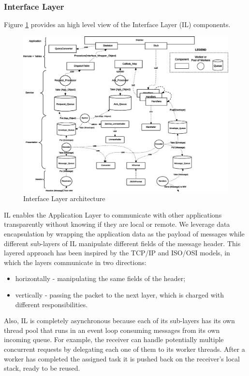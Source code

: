 \subsubsection{Interface Layer}

Figure \ref{fig:impl-il-arch} provides an high level view of
the Interface Layer (IL) components.

\begin{figure}[H]
  \centering
  \includegraphics[width=\columnwidth]{images/solution/il.eps}
  \caption{Interface Layer architecture}
  \label{fig:impl-il-arch}
\end{figure}

IL enables the Application Layer to communicate with other applications
transparently without knowing if they are local or remote. We leverage data
encapsulation by wrapping the application data as the payload of messages while
different sub-layers of IL manipulate different fields of the
message header.
This layered approach has been inspired by the TCP/IP and ISO/OSI models, in
which the layers communicate in two directions:
\begin{itemize}
	\item horizontally - manipulating the same fields of the header;
	\item vertically  - passing the packet to the next
layer, which is charged with different responsibilities.
\end{itemize}
Also, IL is completely asynchronous because each of its sub-layers has its own
thread pool that runs in an event loop consuming messages from its own incoming
queue. For example, the receiver can handle potentially multiple concurrent
requests by delegating each one of them to its worker threads. After a worker has
completed the assigned task it is pushed back on the receiver's local stack,
ready to be reused.


